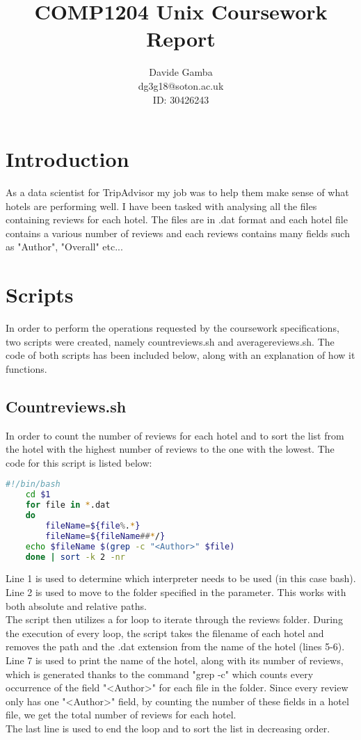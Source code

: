 \documentclass{article}
\title{COMP1204 Unix Coursework Report}
\author{Davide Gamba\\dg3g18@soton.ac.uk\\ID: 30426243}
\begin{document}
	
	\maketitle
	
	\section{Introduction}
	As a data scientist for TripAdvisor my job was to help them make sense of what hotels are performing well. I have been tasked with analysing all the files containing reviews for each hotel. The files are in .dat format and each hotel file contains a various number of reviews and each reviews contains many fields such as "Author", "Overall" etc...\\
	
	\section{Scripts}
	In order to perform the operations requested by the coursework specifications, two scripts were created, namely countreviews.sh and averagereviews.sh. The code of both scripts has been included below, along with an explanation of how it functions.
	
	\subsection{Countreviews.sh}
	
	In order to count the number of reviews for each hotel and to sort the list from the hotel with the highest number of reviews to the one with the lowest.
	The code for this script is listed below:
	
    \begin{lstlisting}[language=Bash]
    #!/bin/bash
    cd $1
    for file in *.dat 
    do
        fileName=${file%.*}
        fileName=${fileName##*/} 
    echo $fileName $(grep -c "<Author>" $file) 
    done | sort -k 2 -nr
    \end{lstlisting}
	Line 1 is used to determine which interpreter needs to be used (in this case bash).\\
	Line 2 is used to move to the folder specified in the parameter. This works with both absolute and relative paths.\\
	The script then utilizes a for loop to iterate through the reviews folder. During the execution of every loop, the script takes the filename of each hotel and removes the path and the .dat extension from the name of the hotel (lines 5-6).\\
	Line 7 is used to print the name of the hotel, along with its number of reviews, which is generated thanks to the command "grep -c" which counts every occurrence of the field "\textless Author\textgreater" for each file in the folder. Since every review only has one "\textless Author\textgreater" field, by counting the number of these fields in a hotel file, we get the total number of reviews for each hotel.\\
	The last line is used to end the loop and to sort the list in decreasing order.
    
\end{document}
